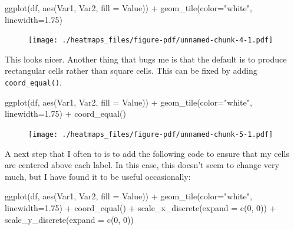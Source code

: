 \documentclass[
  letterpaper,
  DIV=11,
  numbers=noendperiod]{scrreprt}
\newenvironment{Shaded}{\begin{snugshade}}{\end{snugshade}}
\newcommand{\AttributeTok}[1]{\textcolor[rgb]{0.40,0.45,0.13}{#1}}
\newcommand{\DecValTok}[1]{\textcolor[rgb]{0.68,0.00,0.00}{#1}}
\newcommand{\FloatTok}[1]{\textcolor[rgb]{0.68,0.00,0.00}{#1}}
\newcommand{\FunctionTok}[1]{\textcolor[rgb]{0.28,0.35,0.67}{#1}}
\newcommand{\NormalTok}[1]{\textcolor[rgb]{0.00,0.23,0.31}{#1}}
\newcommand{\SpecialCharTok}[1]{\textcolor[rgb]{0.37,0.37,0.37}{#1}}
\newcommand{\StringTok}[1]{\textcolor[rgb]{0.13,0.47,0.30}{#1}}
\begin{document}
\begin{Shaded}
\begin{Highlighting}[]
\FunctionTok{ggplot}\NormalTok{(df, }\FunctionTok{aes}\NormalTok{(Var1, Var2, }\AttributeTok{fill =}\NormalTok{ Value)) }\SpecialCharTok{+} 
  \FunctionTok{geom\_tile}\NormalTok{(}\AttributeTok{color=}\StringTok{"white"}\NormalTok{, }\AttributeTok{linewidth=}\FloatTok{1.75}\NormalTok{)}
\end{Highlighting}
\end{Shaded}

\begin{figure}[H]

{\centering \texttt{[image: ./heatmaps\_files/figure-pdf/unnamed-chunk-4-1.pdf]}

}

\end{figure}

This looks nicer. Another thing that bugs me is that the default is to
produce rectangular cells rather than square cells. This can be fixed by
adding \texttt{coord\_equal()}.

\begin{Shaded}
\begin{Highlighting}[]
\FunctionTok{ggplot}\NormalTok{(df, }\FunctionTok{aes}\NormalTok{(Var1, Var2, }\AttributeTok{fill =}\NormalTok{ Value)) }\SpecialCharTok{+} 
  \FunctionTok{geom\_tile}\NormalTok{(}\AttributeTok{color=}\StringTok{"white"}\NormalTok{, }\AttributeTok{linewidth=}\FloatTok{1.75}\NormalTok{) }\SpecialCharTok{+}
  \FunctionTok{coord\_equal}\NormalTok{()}
\end{Highlighting}
\end{Shaded}

\begin{figure}[H]

{\centering \texttt{[image: ./heatmaps\_files/figure-pdf/unnamed-chunk-5-1.pdf]}

}

\end{figure}

A next step that I often to is to add the following code to ensure that
my cells are centered above each label. In this case, this doesn't seem
to change very much, but I have found it to be useful occasionally:

\begin{Shaded}
\begin{Highlighting}[]
\FunctionTok{ggplot}\NormalTok{(df, }\FunctionTok{aes}\NormalTok{(Var1, Var2, }\AttributeTok{fill =}\NormalTok{ Value)) }\SpecialCharTok{+} 
  \FunctionTok{geom\_tile}\NormalTok{(}\AttributeTok{color=}\StringTok{"white"}\NormalTok{, }\AttributeTok{linewidth=}\FloatTok{1.75}\NormalTok{) }\SpecialCharTok{+}
  \FunctionTok{coord\_equal}\NormalTok{() }\SpecialCharTok{+}
  \FunctionTok{scale\_x\_discrete}\NormalTok{(}\AttributeTok{expand =} \FunctionTok{c}\NormalTok{(}\DecValTok{0}\NormalTok{, }\DecValTok{0}\NormalTok{)) }\SpecialCharTok{+}
  \FunctionTok{scale\_y\_discrete}\NormalTok{(}\AttributeTok{expand =} \FunctionTok{c}\NormalTok{(}\DecValTok{0}\NormalTok{, }\DecValTok{0}\NormalTok{)) }
\end{Highlighting}
\end{Shaded}
\end{document}
